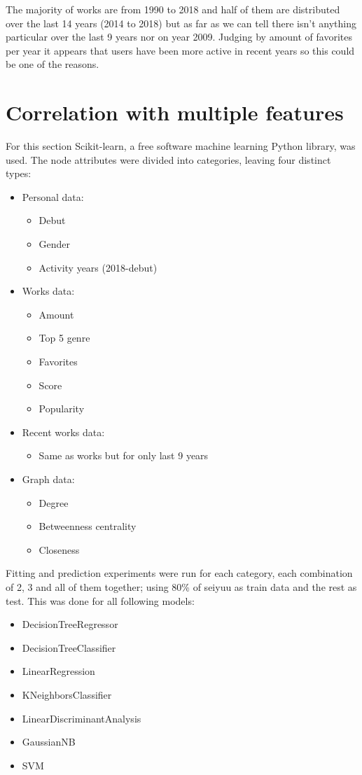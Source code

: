 The majority of works are from 1990 to 2018 and half of them are distributed over the last 14 years (2014 to 2018) but as far as we can tell there isn’t anything particular over the last 9 years nor on year 2009. Judging by amount of favorites per year it appears that users have been more active in recent years so this could be one of the reasons.

\section{Correlation with multiple features}
For this section Scikit-learn, a free software machine learning Python library, was used. The node attributes were divided into categories, leaving four distinct types:

\begin{itemize}
	\item Personal data:
	\begin{itemize}
		\item Debut
		\item Gender
		\item Activity years (2018-debut)
	\end{itemize}
	\item Works data:
	\begin{itemize}
		\item Amount
		\item Top 5 genre
		\item Favorites
		\item Score
		\item Popularity
	\end{itemize}
	\item Recent works data:
	\begin{itemize}
		\item Same as works but for only last 9 years
	\end{itemize}	
	\item Graph data:
	\begin{itemize}
		\item Degree
		\item Betweenness centrality
		\item Closeness
	\end{itemize}
\end{itemize}

Fitting and prediction experiments were run for each category, each combination of 2, 3 and all of them together; using 80\% of seiyuu as train data and the rest as test. This was done for all following models:
\begin{itemize}
	\item DecisionTreeRegressor
	\item DecisionTreeClassifier
	\item LinearRegression
	\item KNeighborsClassifier
	\item LinearDiscriminantAnalysis
	\item GaussianNB
	\item SVM
\end{itemize}

